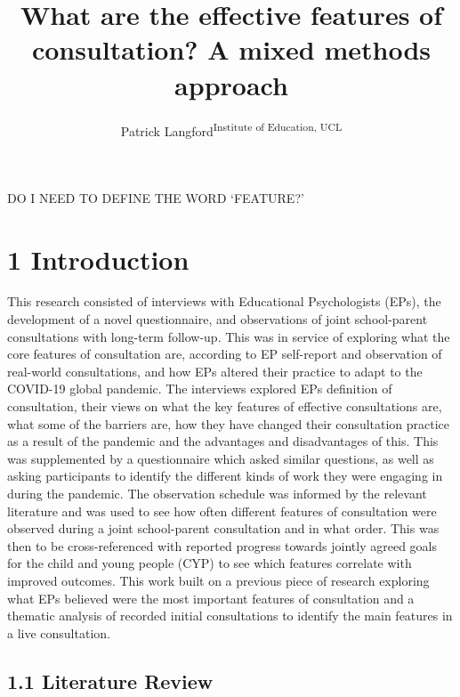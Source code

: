 \documentclass[
  english,
  man]{apa}
\title{What are the effective features of consultation? A mixed methods approach}
\author{Patrick Langford\textsuperscript{Institute of Education, UCL}}
\date{}
\affiliation{\phantom{0}}
\begin{document}
\maketitle

DO I NEED TO DEFINE THE WORD `FEATURE?'

\hypertarget{introduction}{%
\section{1 Introduction}\label{introduction}}

This research consisted of interviews with Educational Psychologists (EPs), the development of a novel questionnaire, and observations of joint school-parent consultations with long-term follow-up. This was in service of exploring what the core features of consultation are, according to EP self-report and observation of real-world consultations, and how EPs altered their practice to adapt to the COVID-19 global pandemic. The interviews explored EPs definition of consultation, their views on what the key features of effective consultations are, what some of the barriers are, how they have changed their consultation practice as a result of the pandemic and the advantages and disadvantages of this. This was supplemented by a questionnaire which asked similar questions, as well as asking participants to identify the different kinds of work they were engaging in during the pandemic. The observation schedule was informed by the relevant literature and was used to see how often different features of consultation were observed during a joint school-parent consultation and in what order. This was then to be cross-referenced with reported progress towards jointly agreed goals for the child and young people (CYP) to see which features correlate with improved outcomes. This work built on a previous piece of research exploring what EPs believed were the most important features of consultation and a thematic analysis of recorded initial consultations to identify the main features in a live consultation.

\hypertarget{literature-review}{%
\subsection{1.1 Literature Review}\label{literature-review}}
\end{document}

